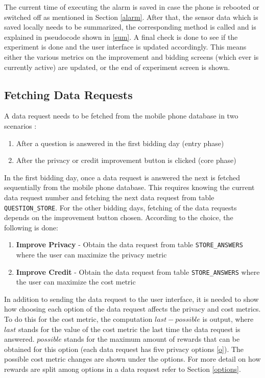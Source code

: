The current time of executing the alarm is saved in case the phone is rebooted or switched off as mentioned in Section \ref{alarm}. After that, the sensor data which is saved locally
needs to be summarized, the corresponding method is called and is explained in pseudocode shown in \ref{sum}. A final check is done to see if the experiment is done and the user interface is updated accordingly. This means either the various metrics on the improvement and bidding screens (which ever is currently active) are updated, or
the end of experiment screen is shown.

\subsection{Fetching Data Requests} \label{data_req}
A data request needs to be fetched from the mobile phone database in two scenarios :

\begin{enumerate}
	\item After a question is answered in the first bidding day (entry phase)
	\item After the privacy or credit improvement button is clicked (core phase)
\end{enumerate}

In the first bidding day, once a data request is answered the next is fetched sequentially from the mobile phone database. This requires knowing the current data request number and fetching the next data request from table \texttt{QUESTION\_STORE}. For the other bidding days, fetching of the data requests depends on the improvement button chosen. According to the choice, the following is done:

\begin{enumerate}
	\item \textbf{Improve Privacy} - Obtain the data request from table \texttt{STORE\_ANSWERS} where the user can maximize the privacy metric
	\item \textbf{Improve Credit} - Obtain the data request from table \texttt{STORE\_ANSWERS} where the user can maximize the cost metric
\end{enumerate}

In addition to sending the data request to the user interface, it is needed to show how choosing each option of the data request affects the privacy and cost metrics. To do this for the cost metric, the computation $last-possible$ is output, where $last$ stands for the value of the cost metric the last time the data request is answered. $possible$ stands for the maximum amount of rewards that can be obtained for this option (each data request has five privacy options \ref{o}). The possible cost metric changes are shown under the options. For more detail on how rewards are split among options in a data request refer to Section \ref{options}.

